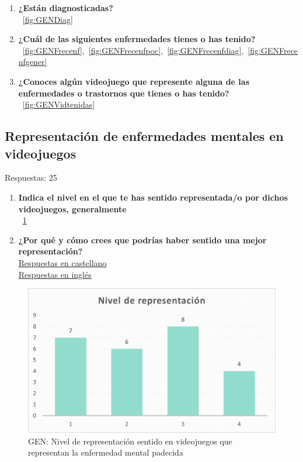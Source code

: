 \documentclass[12pt, a4paper,twoside,titlepage]{book}
\begin{document}
\begin{enumerate}[label=\textbf{\arabic*}.]
     \item \textbf{¿Están diagnosticadas? }\\
    ~\ref{fig:GENDiag}
     \item \textbf{¿Cuál de las siguientes enfermedades tienes o has tenido?}\\
    ~\ref{fig:GENFrecenf},~\ref{fig:GENFrecenfpoc},~\ref{fig:GENFrecenfdiag},~\ref{fig:GENFrecenfgener}
     \item \textbf{¿Conoces algún videojuego que represente alguna de las enfermedades o trastornos que tienes o has tenido?}\\
    ~\ref{fig:GENVidtenidas}
\end{enumerate}




\subsection{Representación de enfermedades mentales en videojuegos}
Respuestas: 25
\begin{enumerate}[label=\textbf{\arabic*}.]
     \item \textbf{Indica el nivel en el que te has sentido representada/o por dichos videojuegos, generalmente}\\
    ~\ref{fig:GENNivel}
     \item \textbf{¿Por qué y cómo crees que podrías haber sentido una mejor representación?}\\
     \hyperref[representacionCastellano]{Respuestas en castellano}\\
     \hyperref[representacionIngles]{Respuestas en inglés}
\end{enumerate}

\begin{figure}
    \centering
    \includegraphics[width=.8\linewidth]{ANEXO Gen/29AnexGENnivel}
    \caption{GEN: Nivel de representación sentido en videojuegos que representan la enfermedad mental padecida}
    \label{fig:GENNivel}
\end{figure}
\end{document}
